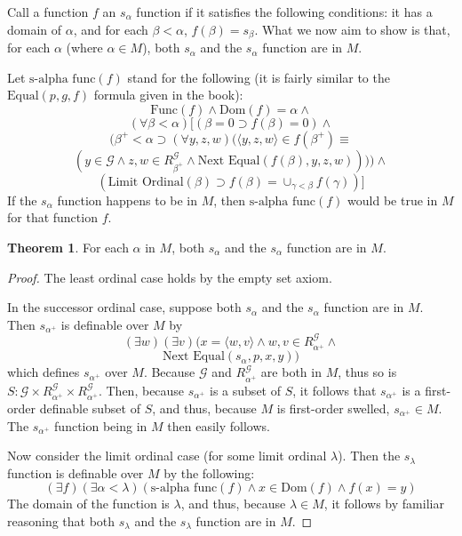 \documentclass{article}
\theoremstyle{definition}
\newtheorem{theorem}{Theorem}[section]
\begin{document}
Call a function $f$ an $s_\alpha$ function if it satisfies the following conditions: it has a domain of 
$\alpha$, and for each $\beta<\alpha$, $f(\beta)=s_\beta$. What we now aim to show is that, for each 
$\alpha$ (where $\alpha\in M$), both $s_\alpha$ and the $s_\alpha$ function are in $M$.

Let $\textrm{s-alpha func}(f)$ stand for the following (it is fairly similar to the 
$\textrm{Equal}(p,g,f)$ formula given in the book):
\[ \textrm{Func}(f)\wedge\textrm{Dom}(f)=\alpha\wedge \]
\[ (\forall\beta<\alpha)[(\beta=0\supset f(\beta)=0)\wedge \]
\[ (\beta^+<\alpha\supset(\forall y,z,w)(\langle y,z,w\rangle\in f(\beta^+)\equiv \]
\[ (y\in\mathcal{G}\wedge z,w\in R^\mathcal{G}_{\beta^+}\wedge\textrm{Next Equal}(f(\beta),y,z,w))))\wedge \]
\[ (\textrm{Limit Ordinal}(\beta)\supset f(\beta)=\cup_{\gamma<\beta}f(\gamma))] \]
If the $s_\alpha$ function happens to be in $M$, then $\textrm{s-alpha func}(f)$ would be true in $M$ for that 
function $f$. 

\begin{theorem}
For each $\alpha$ in $M$, both $s_\alpha$ and the $s_\alpha$ function are in $M$.
\end{theorem}

\begin{proof}
The least ordinal case holds by the empty set axiom.

In the successor ordinal case, suppose both $s_\alpha$ and the $s_\alpha$ function are in $M$. 
Then $s_{\alpha^+}$ is definable over $M$ by 
\[ (\exists w)(\exists v)(x=\langle w,v\rangle\wedge w,v\in R^\mathcal{G}_{\alpha^+}\wedge \]
\[ \textrm{Next Equal}(s_{\alpha},p,x,y)) \]
which defines $s_{\alpha^+}$ over $M$. Because $\mathcal{G}$ and $R^\mathcal{G}_{\alpha^+}$ are 
both in $M$, thus so is $S:\mathcal{G}\times R^\mathcal{G}_{\alpha^+}\times R^\mathcal{G}_{\alpha^+}$.
Then, because $s_{\alpha^+}$ is a subset of $S$, it follows that $s_{\alpha^+}$ is a first-order definable subset of 
$S$, and thus, because $M$ is first-order swelled, $s_{\alpha^+}\in M$. The $s_{\alpha^+}$ function being in $M$ then
easily follows.

Now consider the limit ordinal case (for some limit ordinal $\lambda$). Then 
the $s_\lambda$ function is definable over $M$ by the following:
\[ (\exists f)(\exists\alpha<\lambda)(\textrm{s-alpha func}(f)\wedge x\in\textrm{Dom}(f)\wedge f(x)=y) \]
The domain of the function is $\lambda$, and thus, because $\lambda\in M$, it follows by familiar reasoning that 
both $s_\lambda$ and the $s_\lambda$ function are in $M$.

\end{proof}
\end{document}
